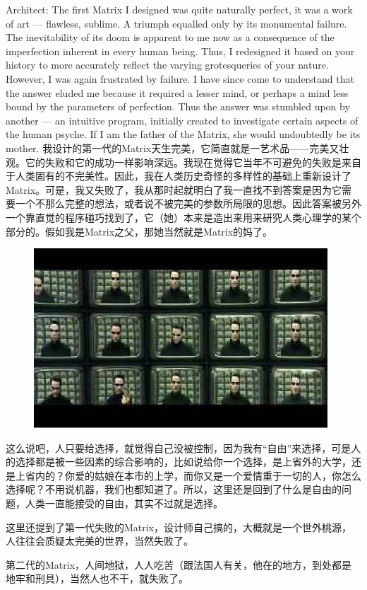 \documentclass[UTF8]{ctexart}
\begin{document}
Architect: The first Matrix I designed was quite naturally perfect, it was a work of art --- flawless, sublime. A triumph equalled only by its monumental failure. The inevitability of its doom is apparent to me now as a consequence of the imperfection inherent in every human being. Thus, I redesigned it based on your history to more accurately reflect the varying grotesqueries of your nature. However, I was again frustrated by failure. I have since come to understand that the answer eluded me because it required a lesser mind, or perhaps a mind less bound by the parameters of perfection. Thus the answer was stumbled upon by another --- an intuitive program, initially created to investigate certain aspects of the human psyche. If I am the father of the Matrix, she would undoubtedly be its mother. 我设计的第一代的Matrix天生完美，它简直就是一艺术品——完美又壮观。它的失败和它的成功一样影响深远。我现在觉得它当年不可避免的失败是来自于人类固有的不完美性。因此，我在人类历史奇怪的多样性的基础上重新设计了Matrix。可是，我又失败了，我从那时起就明白了我一直找不到答案是因为它需要一个不那么完整的想法，或者说不被完美的参数所局限的思想。因此答案被另外一个靠直觉的程序碰巧找到了，它（她）本来是造出来用来研究人类心理学的某个部分的。假如我是Matrix之父，那她当然就是Matrix的妈了。

\begin{figure}[htb]
\centering
\includegraphics[width=0.5\linewidth]{fig/read_reloaded-162}
\end{figure}

这么说吧，人只要给选择，就觉得自己没被控制，因为我有“自由”来选择，可是人的选择都是被一些因素的综合影响的，比如说给你一个选择，是上省外的大学，还是上省内的？你爱的姑娘在本市的上学，而你又是一个爱情重于一切的人，你怎么选择呢？不用说机器，我们也都知道了。所以，这里还是回到了什么是自由的问题，人类一直能接受的自由，其实不过就是选择。

这里还提到了第一代失败的Matrix，设计师自己搞的，大概就是一个世外桃源，人往往会质疑太完美的世界，当然失败了。

第二代的Matrix，人间地狱，人人吃苦（跟法国人有关，他在的地方，到处都是地牢和刑具），当然人也不干，就失败了。
\end{document}
